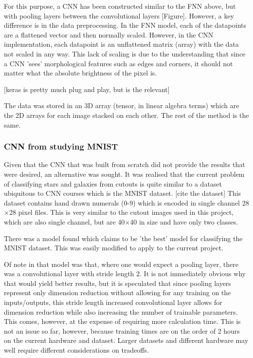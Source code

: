 \documentclass[a4paper,fleqn,usenatbib]{mnras}
\begin{document}
For this purpose, a CNN has been constructed similar to the FNN above, but with pooling layers between the convolutional layers [Figure]. However, a key difference is in the data preprocessing. In the FNN model, each of the datapoints are a flattened vector and then normally scaled. However, in the CNN implementation, each datapoint is an unflattened matrix (array) with the data not scaled in any way. This lack of scaling is due to the understanding that since a CNN 'sees' morphological features such as edges and corners, it should not matter what the absolute brightness of the pixel is. 

[keras is pretty much plug and play, but is the relevant]

The data was stored in an 3D array (tensor, in linear algebra terms) which are the 2D arrays for each image stacked on each other. The rest of the method is the same. 
\subsubsection{CNN from studying MNIST}
Given that the CNN that was built from scratch did not provide the results that were desired, an alternative was sought. It was realised that the current problem of classifying stars and galaxies from cutouts is quite similar to a dataset ubiquitous to CNN courses which is the MNIST dataset. [cite the dataset] This dataset contains hand drawn numerals (0-9) which is encoded in single channel 28$\times$28 pixel files. This is very similar to the cutout images used in this project, which are also single channel, but are 40$\times$40 in size and have only two classes. 

There was a model found which claims to be 'the best' model for classifying the MNIST dataset. This was easily modified to apply to the current project. 

Of note in that model was that, where one would expect a pooling layer, there was a convolutional layer with stride length 2. It is not immediately obvious why that would yield better results, but it is speculated that since pooling layers represent only dimension reduction without allowing for any training on the inputs/outputs, this stride length increased convolutional layer allows for dimension reduction while also increasing the number of trainable parameters. This comes, however, at the expense of requiring more calculation time. This is not an issue so far, however, because training times are on the order of 2 hours on the current hardware and dataset. Larger datasets and different hardware may well require different considerations on tradeoffs. 
\end{document}
